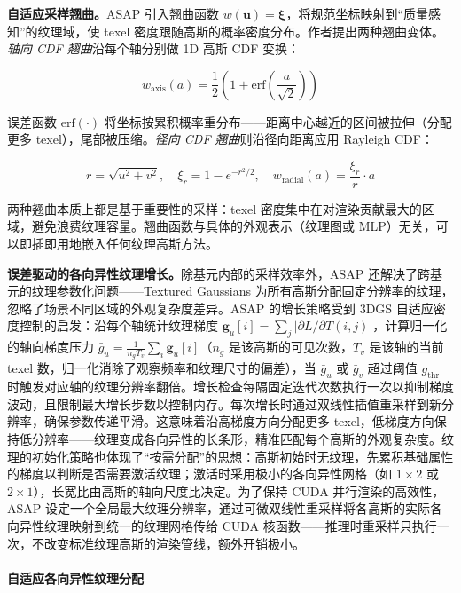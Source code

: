 \textbf{自适应采样翘曲。}ASAP 引入翘曲函数 $w(\mathbf{u}) = \boldsymbol{\xi}$，将规范坐标映射到``质量感知''的纹理域，使 texel 密度跟随高斯的概率密度分布。作者提出两种翘曲变体。\textit{轴向 CDF 翘曲}沿每个轴分别做 1D 高斯 CDF 变换：

\begin{equation}
w_{\text{axis}}(a) = \frac{1}{2}\left(1 + \text{erf}\left(\frac{a}{\sqrt{2}}\right)\right)
\end{equation}

误差函数 $\text{erf}(\cdot)$ 将坐标按累积概率重分布——距离中心越近的区间被拉伸（分配更多 texel），尾部被压缩。\textit{径向 CDF 翘曲}则沿径向距离应用 Rayleigh CDF：

\begin{equation}
r = \sqrt{u^2 + v^2}, \quad \xi_r = 1 - e^{-r^2/2}, \quad w_{\text{radial}}(a) = \frac{\xi_r}{r} \cdot a
\end{equation}

两种翘曲本质上都是基于重要性的采样：texel 密度集中在对渲染贡献最大的区域，避免浪费纹理容量。翘曲函数与具体的外观表示（纹理图或 MLP）无关，可以即插即用地嵌入任何纹理高斯方法。

\textbf{误差驱动的各向异性纹理增长。}除基元内部的采样效率外，ASAP 还解决了跨基元的纹理参数化问题——Textured Gaussians 为所有高斯分配固定分辨率的纹理，忽略了场景不同区域的外观复杂度差异。ASAP 的增长策略受到 3DGS 自适应密度控制的启发：沿每个轴统计纹理梯度 $\mathbf{g}_u[i] = \sum_j |\partial L / \partial T(i,j)|$，计算归一化的轴向梯度压力 $\bar{g}_u = \frac{1}{n_g T_v}\sum_i \mathbf{g}_u[i]$（$n_g$ 是该高斯的可见次数，$T_v$ 是该轴的当前 texel 数，归一化消除了观察频率和纹理尺寸的偏差），当 $\bar{g}_u$ 或 $\bar{g}_v$ 超过阈值 $g_{\text{thr}}$ 时触发对应轴的纹理分辨率翻倍。增长检查每隔固定迭代次数执行一次以抑制梯度波动，且限制最大增长步数以控制内存。每次增长时通过双线性插值重采样到新分辨率，确保参数传递平滑。这意味着沿高梯度方向分配更多 texel，低梯度方向保持低分辨率——纹理变成各向异性的长条形，精准匹配每个高斯的外观复杂度。纹理的初始化策略也体现了``按需分配''的思想：高斯初始时无纹理，先累积基础属性的梯度以判断是否需要激活纹理；激活时采用极小的各向异性网格（如 $1 \times 2$ 或 $2 \times 1$），长宽比由高斯的轴向尺度比决定。为了保持 CUDA 并行渲染的高效性，ASAP 设定一个全局最大纹理分辨率，通过可微双线性重采样将各高斯的实际各向异性纹理映射到统一的纹理网格传给 CUDA 核函数——推理时重采样只执行一次，不改变标准纹理高斯的渲染管线，额外开销极小。

\paragraph{自适应各向异性纹理分配}

